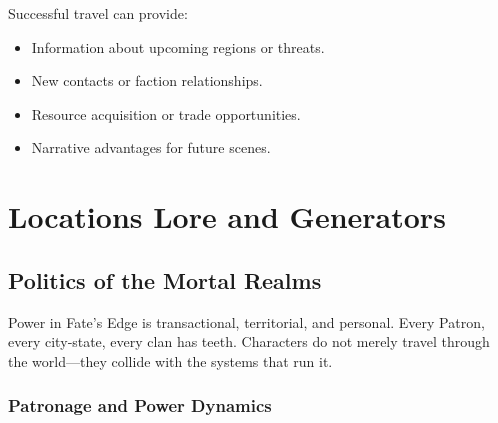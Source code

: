 Successful travel can provide:
\begin{itemize}
    \item Information about upcoming regions or threats.
    \item New contacts or faction relationships.
    \item Resource acquisition or trade opportunities.
    \item Narrative advantages for future scenes.
\end{itemize}

\clearpage
\section{Locations Lore and Generators}

\clearpage

\clearpage

\clearpage

\clearpage

\clearpage

\clearpage

\clearpage

\clearpage

\clearpage

\clearpage

\clearpage

\clearpage

\clearpage

\clearpage

\clearpage

\clearpage

\clearpage

\clearpage

\clearpage

\clearpage

\clearpage

\clearpage

\subsection{Politics of the Mortal Realms}\label{subsec:politics_mortal_realms}

Power in Fate's Edge is transactional, territorial, and personal. Every Patron, every city‑state, every clan has teeth. Characters do not merely travel through the world---they collide with the systems that run it.

\subsubsection{Patronage and Power Dynamics}

